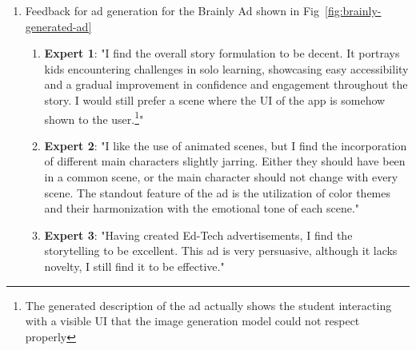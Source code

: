 \begin{enumerate}
\begin{enumerate}
    \end{enumerate}
    \item Feedback for ad generation for the Brainly Ad shown in Fig~\ref{fig:brainly-generated-ad}
    \begin{enumerate}
        \item \textbf{Expert 1}: "I find the overall story formulation to be decent. It portrays kids encountering challenges in solo learning, showcasing easy accessibility and a gradual improvement in confidence and engagement throughout the story. I would still prefer a scene where the UI of the app is somehow shown to the user.\footnote{The generated description of the ad actually shows the student interacting with a visible UI that the image generation model could not respect properly}"
        \item \textbf{Expert 2}: "I like the use of animated scenes, but I find the incorporation of different main characters slightly jarring. Either they should have been in a common scene, or the main character should not change with every scene. The standout feature of the ad is the utilization of color themes and their harmonization with the emotional tone of each scene."
        \item \textbf{Expert 3}: "Having created Ed-Tech advertisements, I find the storytelling to be excellent. This ad is very persuasive, although it lacks novelty, I still find it to be effective."
    \end{enumerate}
\end{enumerate}





